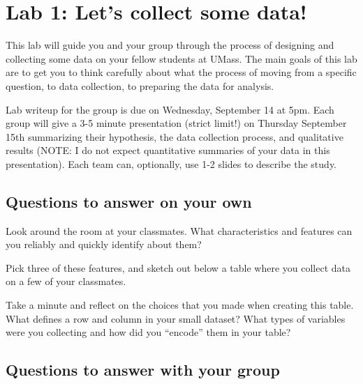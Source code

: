 \documentclass{article}\usepackage[]{graphicx}\usepackage[]{color}
\begin{document}

\section*{Lab 1: Let's collect some data!}

This lab will guide you and your group through the process of designing and collecting some data on your fellow students at UMass. The main goals of this lab are to get you to think carefully about what the process of moving from a specific question, to data collection, to preparing the data for analysis.

Lab writeup for the group is due on Wednesday, September 14 at 5pm. Each group will give a 3-5 minute presentation (strict limit!) on Thursday September 15th summarizing their hypothesis, the data collection process, and qualitative results (NOTE: I do not expect quantitative summaries of your data in this presentation). Each team can, optionally, use 1-2 slides to describe the study.

\subsection*{Questions to answer on your own}

\begin{exercise}
Look around the room at your classmates. What characteristics and features can you reliably and quickly identify about them? 
\end{exercise}

\bigskip

\begin{exercise}
Pick three of these features, and sketch out below a table where you collect data on a few of your classmates. 
\end{exercise}

\clearpage

\begin{exercise}
Take a minute and reflect on the choices that you made when creating this table. What defines a row and column in your small dataset? What types of variables were you collecting and how did you ``encode'' them in your table?
\end{exercise}

\subsection*{Questions to answer with your group}
\end{document}

